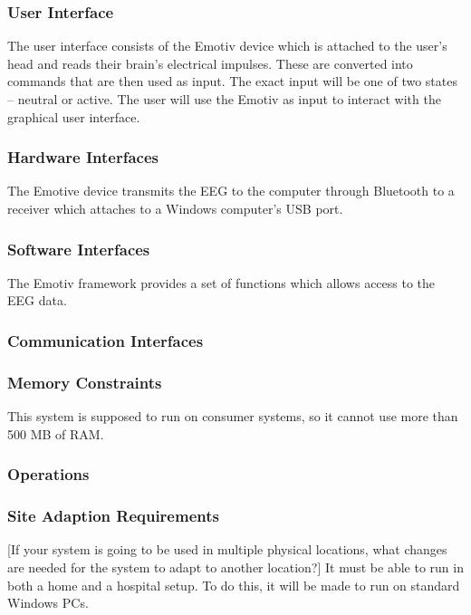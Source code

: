 \documentclass{article}
\begin{document}
\subsubsection{User Interface}

	The user interface consists of the Emotiv device which is attached to the user's head and reads their brain's electrical impulses. These are converted into commands that are then used as input. The exact input will be one of two states – neutral or active. The user will use the Emotiv as input to interact with the graphical user interface.

\subsubsection{Hardware Interfaces}

The Emotive device transmits the EEG to the computer through Bluetooth to a receiver which attaches to a Windows computer's USB port.

\subsubsection{Software Interfaces}

The Emotiv framework provides a set of functions which allows access 	to the EEG data.

\subsubsection{Communication Interfaces}

\subsubsection{Memory Constraints}

This system is supposed to run on consumer systems, so it cannot use more than 500 MB of RAM.

\subsubsection{Operations}

\subsubsection{Site Adaption Requirements}

[If your system is going to be used in multiple physical locations, what changes are needed for the system to adapt to another location?]
It must be able to run in both a home and a hospital setup. To do this, it will be made to run on standard Windows PCs.
\end{document}
